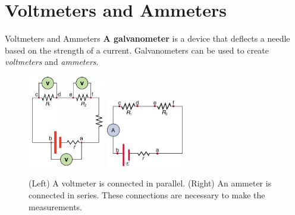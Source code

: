 \documentclass{beamer}
\begin{document}
\section{Voltmeters and Ammeters}

\begin{frame}{Voltmeters and Ammeters}
\textbf{\alert{A galvanometer}} is a device that deflects a needle based on the strength of a current.  Galvanometers can be used to create \textit{voltmeters} and \textit{ammeters}.
\footnotesize
\begin{figure}
\centering
\includegraphics[width=0.3\textwidth]{figures/voltmeter.png} \hspace{0.5cm}
\includegraphics[width=0.3\textwidth]{figures/ammeter.png}
\caption{\label{fig:meas} (Left) A voltmeter is connected in parallel. (Right) An ammeter is connected in series.  These connections are necessary to make the measurements.}
\end{figure}
\end{frame}
\end{document}
